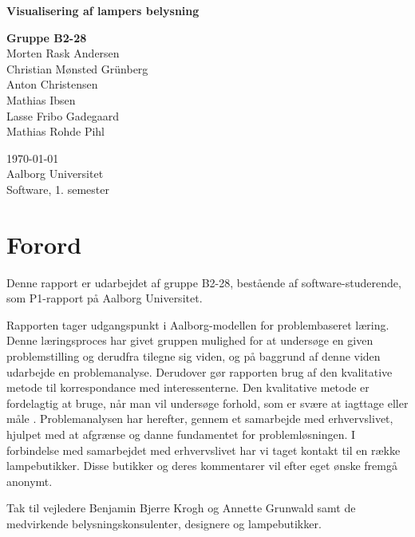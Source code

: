 \begin{titlepage}
  \vspace{0.2cm}
  \begin{center}
    \Huge{\textbf{Visualisering af lampers belysning}}
  \end{center}
  \vspace{0.2cm}
  \begin{center}
    \Large{\textbf{Gruppe B2-28}}\\
	Morten Rask Andersen\\
	Christian Mønsted Grünberg\\
	Anton Christensen\\
	Mathias Ibsen\\
	Lasse Fribo Gadegaard\\
	Mathias Rohde Pihl
  \end{center}
  \vfill
  \begin{center}
 	\today\\
    Aalborg Universitet\\
    Software, 1. semester
  \end{center}
\end{titlepage}


\addtocounter{page}{-1}
\clearpage



\clearpage


\section{Forord}
Denne rapport er udarbejdet af gruppe B2-28, bestående af software-studerende, som P1-rapport på Aalborg Universitet.

Rapporten tager udgangspunkt i Aalborg-modellen for problembaseret læring. Denne læringsproces har givet gruppen mulighed for at undersøge en given problemstilling og derudfra tilegne sig viden, og på baggrund af denne viden udarbejde en problemanalyse. Derudover gør rapporten brug af den kvalitative metode til korrespondance med interessenterne. Den kvalitative metode er fordelagtig at bruge, når man vil undersøge forhold, som er svære at iagttage eller måle \cite{kvalitativ_metode}. Problemanalysen har herefter, gennem et samarbejde med erhvervslivet, hjulpet med at afgrænse og danne fundamentet for problemløsningen. I forbindelse med samarbejdet med erhvervslivet har vi taget kontakt til en række lampebutikker. Disse butikker og deres kommentarer vil efter eget ønske fremgå anonymt. 

Tak til vejledere Benjamin Bjerre Krogh og Annette Grunwald samt de medvirkende belysningskonsulenter, designere og lampebutikker.
\clearpage

\clearpage